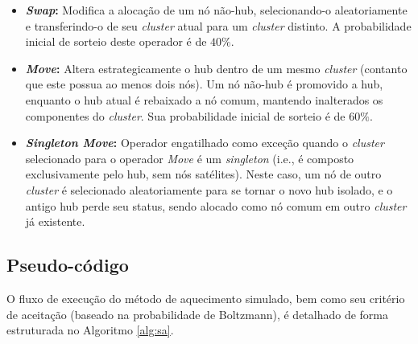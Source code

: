 \begin{itemize}
    \item \textbf{\textit{Swap}:} Modifica a alocação de um nó não-hub, selecionando-o aleatoriamente e transferindo-o de seu \textit{cluster} atual para um \textit{cluster} distinto. A probabilidade inicial de sorteio deste operador é de $40\%$.
    \item \textbf{\textit{Move}:} Altera estrategicamente o hub dentro de um mesmo \textit{cluster} (contanto que este possua ao menos dois nós). Um nó não-hub é promovido a hub, enquanto o hub atual é rebaixado a nó comum, mantendo inalterados os componentes do \textit{cluster}. Sua probabilidade inicial de sorteio é de $60\%$.
    \item \textbf{\textit{Singleton Move}:} Operador engatilhado como exceção quando o \textit{cluster} selecionado para o operador \textit{Move} é um \textit{singleton} (i.e., é composto exclusivamente pelo hub, sem nós satélites). Neste caso, um nó de outro \textit{cluster} é selecionado aleatoriamente para se tornar o novo hub isolado, e o antigo hub perde seu status, sendo alocado como nó comum em outro \textit{cluster} já existente.
\end{itemize}

\subsection{Pseudo-código}

O fluxo de execução do método de aquecimento simulado, bem como seu critério de aceitação (baseado na probabilidade de Boltzmann), é detalhado de forma estruturada no Algoritmo \ref{alg:sa}.

